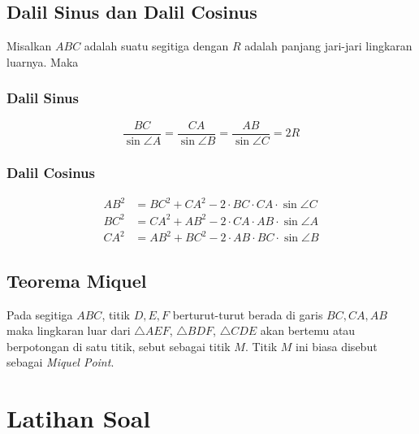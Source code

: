     \subsection{Dalil Sinus dan Dalil Cosinus}
        Misalkan $ABC$ adalah suatu segitiga dengan $R$ adalah panjang jari-jari lingkaran luarnya. Maka
        \subsubsection{Dalil Sinus}
        $$\dfrac{BC}{\sin \angle A} = \dfrac{CA}{\sin \angle B}= \dfrac{AB}{\sin \angle C} = 2R$$
        
        \subsubsection{Dalil Cosinus}
        \begin{align*}
            AB^2 &= BC^2 + CA^2 - 2\cdot BC \cdot CA \cdot \sin \angle C\\
            BC^2 &= CA^2 + AB^2 - 2\cdot CA \cdot AB \cdot \sin \angle A\\
            CA^2 &= AB^2 + BC^2 - 2\cdot AB \cdot BC \cdot \sin \angle B
        \end{align*}
        
        
    \subsection{Teorema Miquel}
        Pada segitiga $ABC$, titik $D,E,F$ berturut-turut berada di garis $BC,CA,AB$ maka lingkaran luar dari $\triangle AEF$, $\triangle  BDF$, $\triangle CDE$ akan bertemu atau berpotongan di satu titik, sebut sebagai titik $M$. Titik $M$ ini biasa disebut sebagai \textit{Miquel Point}.
        
    \section{Latihan Soal}

